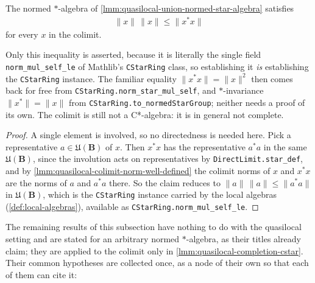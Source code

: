 \begin{lemma}
    \label{lmm:quasilocal-colimit-cstar-identity}
    \leanok
    The normed $*$-algebra of \ref{lmm:quasilocal-union-normed-star-algebra} satisfies
    \begin{align}
        \|x\| \, \|x\| \le \|x^{*} x\|
    \end{align}
    for every $x$ in the colimit.

    Only this inequality is asserted, because it is literally the single field \texttt{norm\_mul\_self\_le} of Mathlib's \texttt{CStarRing} class, so establishing it \emph{is} establishing the \texttt{CStarRing} instance. The familiar equality $\|x^{*}x\| = \|x\|^{2}$ then comes back for free from \texttt{CStarRing.norm\_star\_mul\_self}, and $*$-invariance $\|x^{*}\| = \|x\|$ from \texttt{CStarRing.to\_normedStarGroup}; neither needs a proof of its own. The colimit is still not a C*-algebra: it is in general not complete.
\end{lemma}
\begin{proof}
    \leanok
    A single element is involved, so no directedness is needed here. Pick a representative $a \in \mathfrak{U}(\mathbf{B})$ of $x$. Then $x^{*}x$ has the representative $a^{*}a$ in the same $\mathfrak{U}(\mathbf{B})$, since the involution acts on representatives by \texttt{DirectLimit.star\_def}, and by \ref{lmm:quasilocal-colimit-norm-well-defined} the colimit norms of $x$ and $x^{*}x$ are the norms of $a$ and $a^{*}a$ there. So the claim reduces to $\|a\|\,\|a\| \le \|a^{*}a\|$ in $\mathfrak{U}(\mathbf{B})$, which is the \texttt{CStarRing} instance carried by the local algebras (\ref{def:local-algebras}), available as \texttt{CStarRing.norm\_mul\_self\_le}.
\end{proof}

The remaining results of this subsection have nothing to do with the quasilocal setting and are stated for an arbitrary normed $*$-algebra, as their titles already claim; they are applied to the colimit only in \ref{lmm:quasilocal-completion-cstar}. Their common hypotheses are collected once, as a node of their own so that each of them can cite it:

